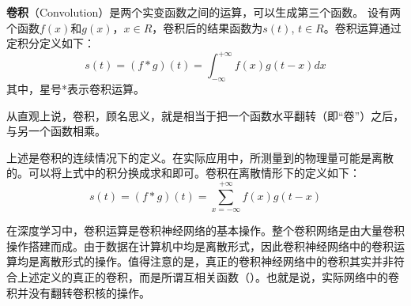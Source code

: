 
\textbf{卷积}（Convolution）是两个实变函数之间的运算，可以生成第三个函数。
设有两个函数$f(x)$和$g(x)$，$x \in R$，卷积后的结果函数为$s(t)$, $t \in R$。卷积运算通过定积分定义如下：
\begin{equation}
s(t) = (f*g)(t) = \int_{ - \infty }^{ + \infty } {f(x)g(t - x)dx}
\end{equation}
其中，星号*表示卷积运算。

从直观上说，卷积，顾名思义，就是相当于把一个函数水平翻转（即“卷”）之后，与另一个函数相乘。

上述是卷积的连续情况下的定义。在实际应用中，所测量到的物理量可能是离散的。可以将上式中的积分换成求和即可。卷积在离散情形下的定义如下：
\begin{equation}
s(t) = (f*g)(t) = \sum_{ x = - \infty }^{ + \infty } {f(x)g(t - x)}
\end{equation}

在深度学习中，卷积运算是卷积神经网络的基本操作。整个卷积网络是由大量卷积操作搭建而成。由于数据在计算机中均是离散形式，因此卷积神经网络中的卷积运算均是离散形式的操作。值得注意的是，真正的卷积神经网络中的卷积其实并非符合上述定义的真正的卷积，而是所谓互相关函数（）。也就是说，实际网络中的卷积并没有翻转卷积核的操作。